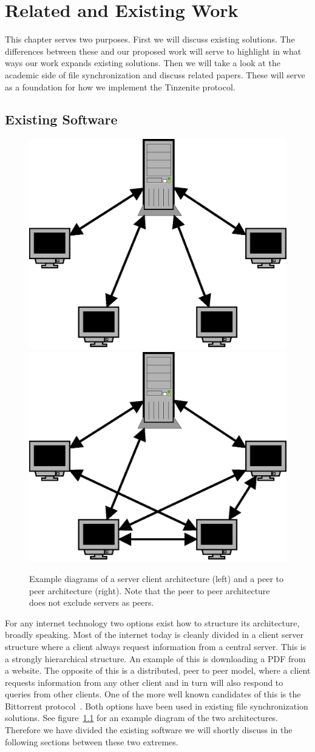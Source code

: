 \chapter{Related and Existing Work}
\label{chap:Related and Existing Work}

This chapter serves two purposes.
First we will discuss existing solutions.
The differences between these and our proposed work will serve to highlight in what ways our work expands existing solutions.
Then we will take a look at the academic side of file synchronization and discuss related papers.
These will serve as a foundation for how we implement the Tinzenite protocol.

\section{Existing Software}

\begin{figure}[htp]
\centering
    \includegraphics[width=0.3\linewidth]{diagram/topo_s2c}
    \hspace{2em}
    \includegraphics[width=0.3\linewidth]{diagram/topo_p2p}
\caption[Example Network Structures]{Example diagrams of a server client architecture (left) and a peer to peer architecture (right). Note that the peer to peer architecture does not exclude servers as peers.}
\label{fig:example_netarch}
\end{figure}

For any internet technology two options exist how to structure its architecture, broadly speaking.
Most of the internet today is cleanly divided in a client server structure where a client always request information from a central server.
This is a strongly hierarchical structure.
An example of this is downloading a PDF from a website.
The opposite of this is a distributed, peer to peer model, where a client requests information from any other client and in turn will also respond to queries from other clients.
One of the more well known candidates of this is the Bittorrent protocol~\cite{web:site:bittorrent}.
Both options have been used in existing file synchronization solutions.
See figure~\ref{fig:example_netarch} for an example diagram of the two architectures.
Therefore we have divided the existing software we will shortly discuss in the following sections between these two extremes.

